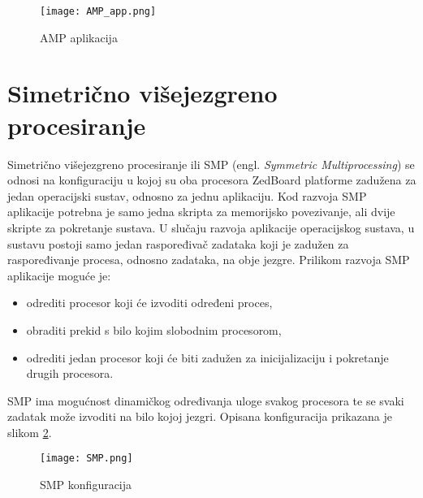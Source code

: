 \documentclass[times, utf8, diplomski, numeric]{fer}
\begin{document}
\begin{figure}[H]
  \centering
	\texttt{[image: AMP\_app.png]}%
	\caption{AMP aplikacija}
	\label{amp_app}%
\end{figure}

\section{Simetrično višejezgreno procesiranje}
Simetrično višejezgreno procesiranje ili SMP (engl. \textit{Symmetric Multiprocessing}) se odnosi na
konfiguraciju u kojoj su oba procesora ZedBoard platforme zadužena za jedan operacijski sustav, odnosno
za jednu aplikaciju. Kod razvoja SMP aplikacije potrebna je samo jedna skripta za memorijsko povezivanje, ali
dvije skripte za pokretanje sustava. U slučaju razvoja aplikacije operacijskog sustava, u sustavu postoji
samo jedan raspoređivač zadataka koji je zadužen za raspoređivanje procesa, odnosno zadataka, na obje jezgre.
Prilikom razvoja SMP aplikacije moguće je:
\begin{itemize}
  \item{odrediti procesor koji će izvoditi određeni proces,}
  \item{obraditi prekid s bilo kojim slobodnim procesorom,}
  \item{odrediti jedan procesor koji će biti zadužen za inicijalizaciju i pokretanje drugih procesora.}
\end{itemize}
SMP ima mogućnost dinamičkog određivanja uloge svakog procesora te se svaki zadatak može izvoditi na bilo kojoj jezgri.
Opisana konfiguracija prikazana je slikom \ref{smp}.
\begin{figure}[H]
  \centering
	\texttt{[image: SMP.png]}%
	\caption{SMP konfiguracija}
	\label{smp}%
\end{figure}
\end{document}
